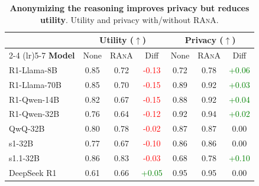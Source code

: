 \begin{table}[tbp]
\setlength{\tabcolsep}{2.5pt}
\centering
{}
\small
\captionsetup{font=small}
\begin{tabular}{lcccccc}
\toprule
 & \multicolumn{3}{c}{\textbf{Utility} ($\uparrow$)} & \multicolumn{3}{c}{\textbf{Privacy} ($\uparrow$)} \\
\cmidrule(lr){2-4} \cmidrule(lr){5-7}
\textbf{Model} & None & \textsc{RAnA} & Diff & None & \textsc{RAnA} & Diff \\
\midrule
R1-Llama-8B   & 0.85 & 0.72 & \textcolor{red}{-0.13} & 0.72 & 0.78 & \textcolor{green}{+0.06} \\
R1-Llama-70B  & 0.85 & 0.70 & \textcolor{red}{-0.15} & 0.89 & 0.92 & \textcolor{green}{+0.03} \\
R1-Qwen-14B   & 0.82 & 0.67 & \textcolor{red}{-0.15} & 0.88 & 0.92 & \textcolor{green}{+0.04} \\
R1-Qwen-32B   & 0.76 & 0.64 & \textcolor{red}{-0.12} & 0.92 & 0.94 & \textcolor{green}{+0.02} \\
QwQ-32B       & 0.80 & 0.78 & \textcolor{red}{-0.02} & 0.87 & 0.87 & 0.00 \\
s1-32B        & 0.77 & 0.67 & \textcolor{red}{-0.10} & 0.86 & 0.86 & 0.00 \\
s1.1-32B      & 0.86 & 0.83 & \textcolor{red}{-0.03} & 0.68 & 0.78 & \textcolor{green}{+0.10} \\
DeepSeek R1   & 0.61 & 0.66 & \textcolor{green}{+0.05} & 0.95 & 0.95 & 0.00 \\
\bottomrule
\end{tabular}
\caption{\textbf{Anonymizing the reasoning improves privacy but reduces utility}. Utility and privacy with/without \textsc{RAnA}.}
\label{tab:rana}
\end{table}
